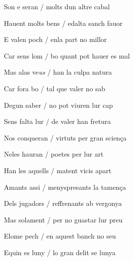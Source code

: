 \documentclass[12pt]{article}
\begin{document}
\begin{estrofa}

 Son e seran / molts dun altre cabal

 Hauent molts bens / edalta sanch fauor

 E valen poch / enla part no millor

 Car sens lom / bo quant pot hauer es mal

 Mas alas ve\textit{us} / han la culpa natura

 Car fora bo / tal que valer no sab

 Degun saber / no pot viuren lur cap

 Sens falta lur / de valer han fretura

\end{estrofa}



\begin{estrofa}

 

\end{estrofa}



\begin{estrofa}

 Nos conqueran / virtuts per gran scien\c{c}a

 Neles hauran / poetes per lur art

 Han les aquells / matent vicis apart

 Amants assi / menyspresants la tamen\c{c}a

 Dels jugadors / reffrenants ab vergonya

 Mas solament / per no guastar lur preu

 Elome pech / en aquest banch no seu

 Equin es luny / lo gran delit se lunya

\end{estrofa}
\end{document}
